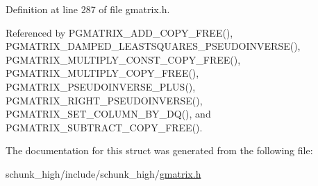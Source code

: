 Definition at line 287 of file gmatrix.\-h.



Referenced by P\-G\-M\-A\-T\-R\-I\-X\-\_\-\-A\-D\-D\-\_\-\-C\-O\-P\-Y\-\_\-\-F\-R\-E\-E(), P\-G\-M\-A\-T\-R\-I\-X\-\_\-\-D\-A\-M\-P\-E\-D\-\_\-\-L\-E\-A\-S\-T\-S\-Q\-U\-A\-R\-E\-S\-\_\-\-P\-S\-E\-U\-D\-O\-I\-N\-V\-E\-R\-S\-E(), P\-G\-M\-A\-T\-R\-I\-X\-\_\-\-M\-U\-L\-T\-I\-P\-L\-Y\-\_\-\-C\-O\-N\-S\-T\-\_\-\-C\-O\-P\-Y\-\_\-\-F\-R\-E\-E(), P\-G\-M\-A\-T\-R\-I\-X\-\_\-\-M\-U\-L\-T\-I\-P\-L\-Y\-\_\-\-C\-O\-P\-Y\-\_\-\-F\-R\-E\-E(), P\-G\-M\-A\-T\-R\-I\-X\-\_\-\-P\-S\-E\-U\-D\-O\-I\-N\-V\-E\-R\-S\-E\-\_\-\-P\-L\-U\-S(), P\-G\-M\-A\-T\-R\-I\-X\-\_\-\-R\-I\-G\-H\-T\-\_\-\-P\-S\-E\-U\-D\-O\-I\-N\-V\-E\-R\-S\-E(), P\-G\-M\-A\-T\-R\-I\-X\-\_\-\-S\-E\-T\-\_\-\-C\-O\-L\-U\-M\-N\-\_\-\-B\-Y\-\_\-\-D\-Q(), and P\-G\-M\-A\-T\-R\-I\-X\-\_\-\-S\-U\-B\-T\-R\-A\-C\-T\-\_\-\-C\-O\-P\-Y\-\_\-\-F\-R\-E\-E().



The documentation for this struct was generated from the following file\-:\begin{DoxyCompactItemize}
\item 
schunk\-\_\-high/include/schunk\-\_\-high/\hyperlink{gmatrix_8h}{gmatrix.\-h}\end{DoxyCompactItemize}
